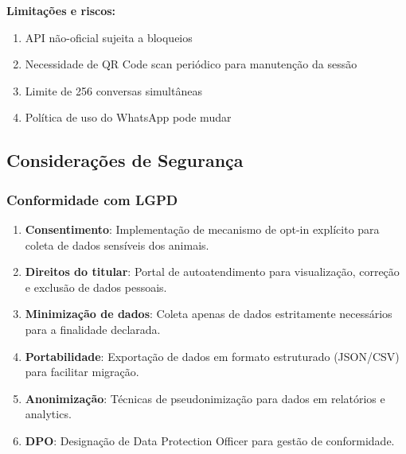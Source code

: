 \documentclass[12pt, a4paper]{article}
\begin{document}
\begin{spacing}{1.5}
\begin{spacing}{1.5}
\textbf{Limitações e riscos:}
\begin{enumerate}[label=\alph*)]
\item API não-oficial sujeita a bloqueios
\item Necessidade de QR Code scan periódico para manutenção da sessão
\item Limite de 256 conversas simultâneas
\item Política de uso do WhatsApp pode mudar
\end{enumerate}
\end{spacing}

\subsection{Considerações de Segurança}

\subsubsection{Conformidade com LGPD}
\begin{spacing}{1.5}
\begin{enumerate}[label=\alph*)]
    \item \textbf{Consentimento}: Implementação de mecanismo de opt-in explícito para coleta de dados sensíveis dos animais.
    \item \textbf{Direitos do titular}: Portal de autoatendimento para visualização, correção e exclusão de dados pessoais.
    \item \textbf{Minimização de dados}: Coleta apenas de dados estritamente necessários para a finalidade declarada.
    \item \textbf{Portabilidade}: Exportação de dados em formato estruturado (JSON/CSV) para facilitar migração.
    \item \textbf{Anonimização}: Técnicas de pseudonimização para dados em relatórios e analytics.
    \item \textbf{DPO}: Designação de Data Protection Officer para gestão de conformidade.
\end{enumerate}
\end{spacing}


\end{spacing}
\end{document}
